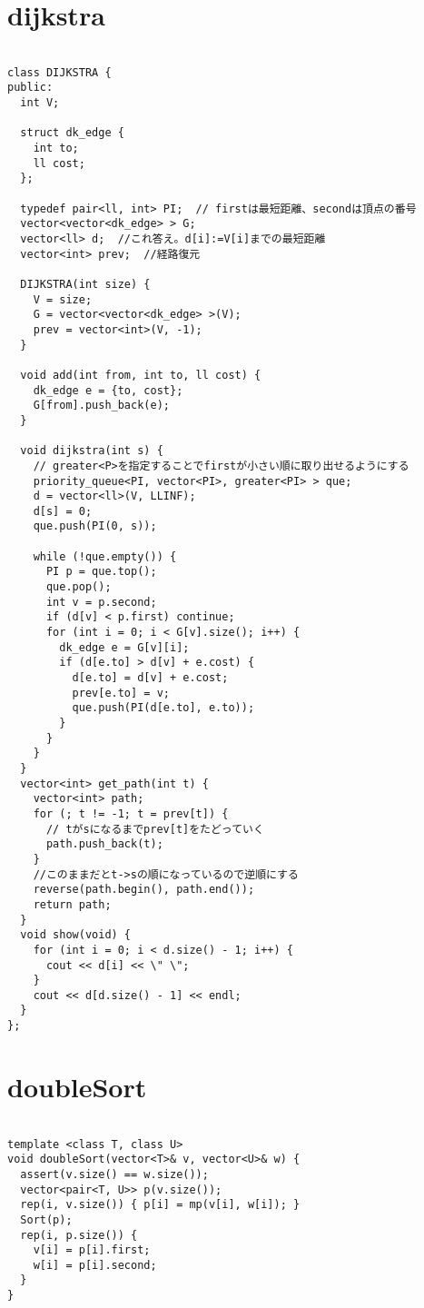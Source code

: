 \documentclass[a4j,titlepage]{jarticle} %
\begin{document}
\section{dijkstra}
\color{black}
\begin{lstlisting}[caption=dijkstra]

class DIJKSTRA {
public:
  int V;

  struct dk_edge {
    int to;
    ll cost;
  };

  typedef pair<ll, int> PI;  // firstは最短距離、secondは頂点の番号
  vector<vector<dk_edge> > G;
  vector<ll> d;  //これ答え。d[i]:=V[i]までの最短距離
  vector<int> prev;  //経路復元

  DIJKSTRA(int size) {
    V = size;
    G = vector<vector<dk_edge> >(V);
    prev = vector<int>(V, -1);
  }

  void add(int from, int to, ll cost) {
    dk_edge e = {to, cost};
    G[from].push_back(e);
  }

  void dijkstra(int s) {
    // greater<P>を指定することでfirstが小さい順に取り出せるようにする
    priority_queue<PI, vector<PI>, greater<PI> > que;
    d = vector<ll>(V, LLINF);
    d[s] = 0;
    que.push(PI(0, s));

    while (!que.empty()) {
      PI p = que.top();
      que.pop();
      int v = p.second;
      if (d[v] < p.first) continue;
      for (int i = 0; i < G[v].size(); i++) {
        dk_edge e = G[v][i];
        if (d[e.to] > d[v] + e.cost) {
          d[e.to] = d[v] + e.cost;
          prev[e.to] = v;
          que.push(PI(d[e.to], e.to));
        }
      }
    }
  }
  vector<int> get_path(int t) {
    vector<int> path;
    for (; t != -1; t = prev[t]) {
      // tがsになるまでprev[t]をたどっていく
      path.push_back(t);
    }
    //このままだとt->sの順になっているので逆順にする
    reverse(path.begin(), path.end());
    return path;
  }
  void show(void) {
    for (int i = 0; i < d.size() - 1; i++) {
      cout << d[i] << \" \";
    }
    cout << d[d.size() - 1] << endl;
  }
};

\end{lstlisting}

\color{white}
\section{doubleSort}
\color{black}
\begin{lstlisting}[caption=doubleSort]

template <class T, class U>
void doubleSort(vector<T>& v, vector<U>& w) {
  assert(v.size() == w.size());
  vector<pair<T, U>> p(v.size());
  rep(i, v.size()) { p[i] = mp(v[i], w[i]); }
  Sort(p);
  rep(i, p.size()) {
    v[i] = p[i].first;
    w[i] = p[i].second;
  }
}

\end{lstlisting}
\end{document}

